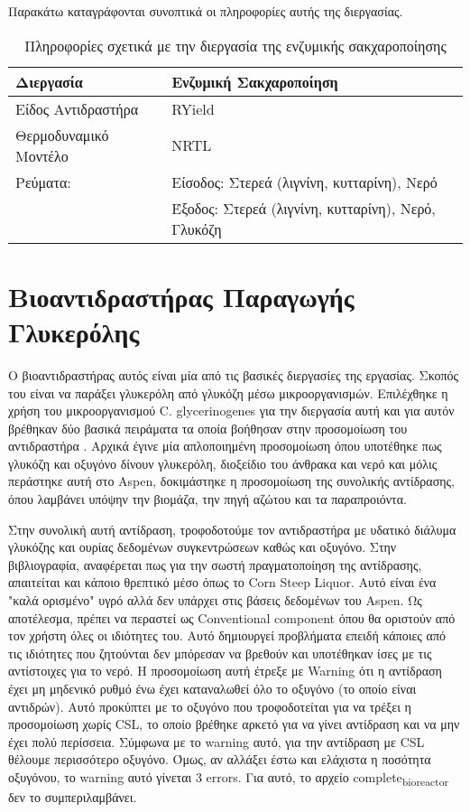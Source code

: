 \documentclass[11pt]{article}
\begin{document}
Παρακάτω καταγράφονται συνοπτικά οι πληροφορίες αυτής της διεργασίας.

\begin{table}[htbp]
\caption{Πληροφορίες σχετικά με την διεργασία της ενζυμικής σακχαροποίησης}
\centering
\begin{tabular}{ll}
\hline
Διεργασία & Ενζυμική Σακχαροποίηση\\
\hline
Είδος Αντιδραστήρα & RYield\\
Θερμοδυναμικό Μοντέλο & NRTL\\
\hline
Ρεύματα: & Είσοδος: Στερεά (λιγνίνη, κυτταρίνη), Νερό\\
\hline
 & Έξοδος: Στερεά (λιγνίνη, κυτταρίνη), Νερό, Γλυκόζη\\
\hline
\end{tabular}
\end{table}

\section{Βιοαντιδραστήρας Παραγωγής Γλυκερόλης}
\label{sec:orgd4599fb}
Ο βιοαντιδραστήρας αυτός είναι μία από τις βασικές διεργασίες της εργασίας. Σκοπός του είναι να παράξει γλυκερόλη από γλυκόζη μέσω μικροοργανισμών. Επιλέχθηκε η χρήση του μικροοργανισμού C. glycerinogenes για την διεργασία αυτή και για αυτόν βρέθηκαν δύο βασικά πειράματα τα οποία βοήθησαν στην προσομοίωση του αντιδραστήρα \cite{zhugeGlycerolProductionNovel2001,jinByproductFormationNovel2003} . Αρχικά έγινε μία απλοποιημένη προσομοίωση όπου υποτέθηκε πως γλυκόζη και οξυγόνο δίνουν γλυκερόλη, διοξείδιο του άνθρακα και νερό και μόλις περάστηκε αυτή στο Aspen, δοκιμάστηκε η προσομοίωση της συνολικής αντίδρασης, όπου λαμβάνει υπόψην την βιομάζα, την πηγή αζώτου και τα παραπροιόντα.

Στην συνολική αυτή αντίδραση, τροφοδοτούμε τον αντιδραστήρα με υδατικό διάλυμα γλυκόζης και ουρίας δεδομένων συγκεντρώσεων καθώς και οξυγόνο. Στην βιβλιογραφία, αναφέρεται πως για την σωστή πραγματοποίηση της αντίδρασης, απαιτείται και κάποιο θρεπτικό μέσο όπως το Corn Steep Liquor. Αυτό είναι ένα "καλά ορισμένο" υγρό αλλά δεν υπάρχει στις βάσεις δεδομένων του Aspen. Ως αποτέλεσμα, πρέπει να περαστεί ως Conventional component όπου θα οριστούν από τον χρήστη όλες οι ιδιότητες του. Αυτό δημιουργεί προβλήματα επειδή κάποιες από τις ιδιότητες που ζητούνται δεν μπόρεσαν να βρεθούν και υποτέθηκαν ίσες με τις αντίστοιχες για το νερό. Η προσομοίωση αυτή έτρεξε με Warning ότι η αντίδραση έχει μη μηδενικό ρυθμό ένω έχει καταναλωθεί όλο το οξυγόνο (το οποίο είναι αντιδρών). Αυτό προκύπτει με το οξυγόνο που τροφοδοτείται για να τρέξει η προσομοίωση χωρίς CSL, το οποίο βρέθηκε αρκετό για να γίνει αντίδραση και να μην έχει πολύ περίσσεια. Σύμφωνα με το warning αυτό, για την αντίδραση με CSL θέλουμε περισσότερο οξυγόνο. Όμως, αν αλλάξει έστω και ελάχιστα η ποσότητα οξυγόνου, το warning αυτό γίνεται 3 errors. Για αυτό, το αρχείο complete\textsubscript{bioreactor} δεν το συμπεριλαμβάνει.
\end{document}
